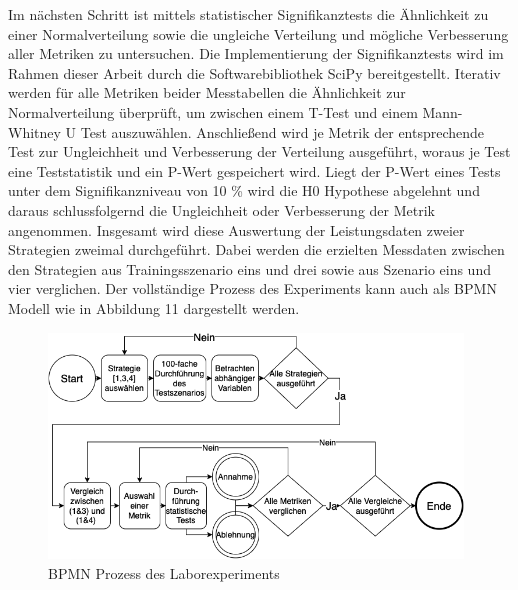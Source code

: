 Im nächsten Schritt ist mittels statistischer Signifikanztests die Ähnlichkeit zu einer Normalverteilung sowie die ungleiche Verteilung und mögliche Verbesserung aller Metriken zu untersuchen.
Die Implementierung der Signifikanztests wird im Rahmen dieser Arbeit durch die Softwarebibliothek SciPy bereitgestellt.
Iterativ werden für alle Metriken beider Messtabellen die Ähnlichkeit zur Normalverteilung überprüft, um zwischen einem T-Test und einem Mann-Whitney U Test auszuwählen.
Anschließend wird je Metrik der entsprechende Test zur Ungleichheit und Verbesserung der Verteilung ausgeführt, woraus je Test eine Teststatistik und ein P-Wert gespeichert wird.
Liegt der P-Wert eines Tests unter dem Signifikanzniveau von 10 \% wird die H0 Hypothese abgelehnt und daraus schlussfolgernd die Ungleichheit oder Verbesserung der Metrik angenommen.
Insgesamt wird diese Auswertung der Leistungsdaten zweier Strategien zweimal durchgeführt.
Dabei werden die erzielten Messdaten zwischen den Strategien aus Trainingsszenario eins und drei sowie aus Szenario eins und vier verglichen.
Der vollständige Prozess des Experiments kann auch als BPMN Modell wie in Abbildung 11 dargestellt werden. 

\begin{figure}[htb]
    \centering
    \includegraphics[height=6cm]{lib/graphics/experimentflow.png}
    \caption[BPMN Prozess des Laborexperiments]{BPMN Prozess des Laborexperiments\footnotemark}
    \label{abb:experiment flow}
\end{figure}
